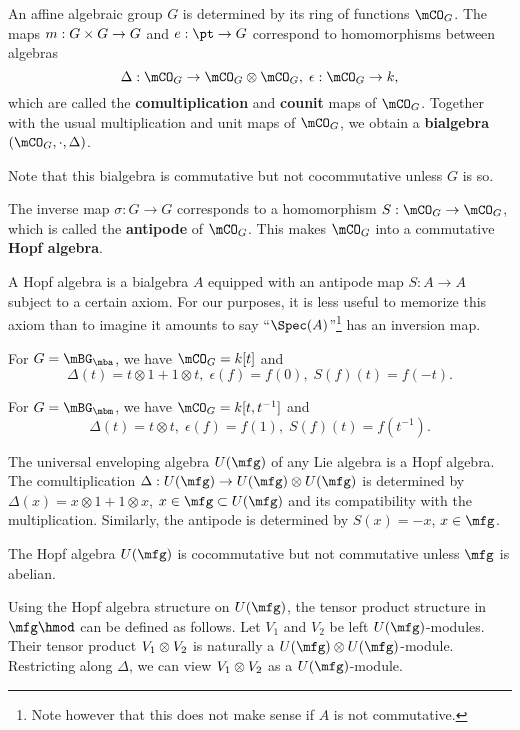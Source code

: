 \begin{constr}
	An affine algebraic group $G$ is determined by its ring of functions $\mCO_G$. The maps $m: G\mt G \to G$ and $e: \pt \to G$ correspond to homomorphisms between algebras
	\[
		\Delta:\mCO_G \to \mCO_G\ot \mCO_G, \; \epsilon: \mCO_G \to k,
	\]
	which are called the \textbf{comultiplication} and \textbf{counit} maps of $\mCO_G$. Together with the usual multiplication and unit maps of $\mCO_G$, we obtain a \textbf{bialgebra} $(\mCO_G, \cdot,\Delta)$. 

	Note that this bialgebra is commutative but not cocommutative unless $G$ is so.

	The inverse map $\sigma:G\to G$ corresponds to a homomorphism $S: \mCO_G\to \mCO_G$, which is called the \textbf{antipode} of $\mCO_G$. This makes $\mCO_G$ into a commutative \textbf{Hopf algebra}. 
\end{constr}

\begin{rem}
	A Hopf algebra is a bialgebra $A$ equipped with an antipode map $S:A\to A$ subject to a certain axiom. For our purposes, it is less useful to memorize this axiom than to imagine it amounts to say ``$\Spec(A)$''\footnote{Note however that this does not make sense if $A$ is not commutative.} has an inversion map.
\end{rem}

\begin{exam}
	For $G=\mBG_\mba$, we have $\mCO_G=k[t]$ and
	\[
		\Delta(t) = t\otimes 1+1\otimes t ,\; \epsilon(f) = f(0),\; S(f)(t) = f(-t).
	\]
\end{exam}

\begin{exam}
	For $G=\mBG_\mbm$, we have $\mCO_G=k[t,t^{-1}]$ and
	\[
		\Delta(t) = t\otimes t ,\; \epsilon(f) = f(1),\; S(f)(t) = f(t^{-1}).
	\]
\end{exam}


\begin{exam}
	The universal enveloping algebra $U(\mfg)$ of any Lie algebra is a Hopf algebra. The comultiplication $\Delta:U(\mfg) \to U(\mfg)\ot U(\mfg)$ is determined by $\Delta(x) = x\otimes 1 + 1\otimes x$, $x\in \mfg \subset U(\mfg)$ and its compatibility with the multiplication. Similarly, the antipode is determined by $S(x)=-x$, $x\in \mfg$.

	The Hopf algebra $U(\mfg)$ is cocommutative but not commutative unless $\mfg$ is abelian.
\end{exam}

\begin{rem}
	Using the Hopf algebra structure on $U(\mfg)$, the tensor product structure in $\mfg\hmod$ can be defined as follows. Let $V_1$ and $V_2$ be left $U(\mfg)$-modules. Their tensor product $V_1\ot V_2$ is naturally a $U(\mfg)\ot U(\mfg)$-module. Restricting along $\Delta$, we can view $V_1\ot V_2$ as a $U(\mfg)$-module.
\end{rem}



